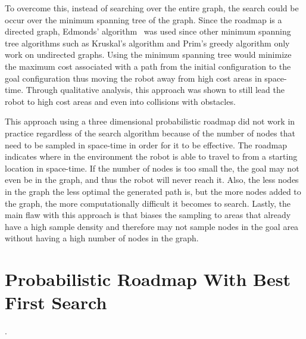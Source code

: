 To overcome this, instead of searching over the entire graph, the search could
be occur over the minimum spanning tree of the graph.  Since the roadmap is a
directed graph, Edmonds' algorithm~\cite{edmonds} was used since other minimum
spanning tree algorithms such as Kruskal's algorithm and Prim's greedy
algorithm only work on undirected graphs. Using the minimum spanning tree would
minimize the maximum cost associated with a path from the initial configuration
to the goal configuration thus moving the robot away from high cost areas in
space-time. Through qualitative analysis, this approach was shown to still lead
the robot to high cost areas and even into collisions with obstacles.

This approach using a three dimensional probabilistic roadmap did not work in
practice regardless of the search algorithm because of the number of nodes that
need to be sampled in space-time in order for it to be effective.  The roadmap
indicates where in the environment the robot is able to travel to from a
starting location in space-time. If the number of nodes is too small the, the
goal may not even be in the graph, and thus the robot will never reach it.
Also, the less nodes in the graph the less optimal the generated path is, but
the more nodes added to the graph, the more computationally difficult it
becomes to search. Lastly, the main flaw with this approach is that biases the
sampling to areas that already have a high sample density and therefore may not
sample nodes in the goal area without having a high number of nodes in the
graph.

\section{Probabilistic Roadmap With Best First Search}

\label{sec:dodgermethod}.


